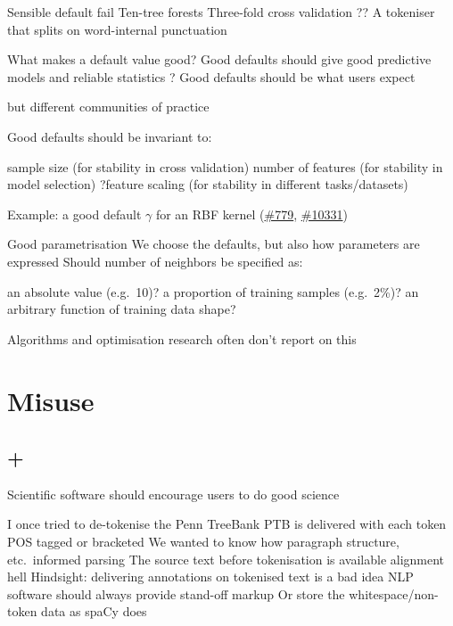 \documentclass[aspectratio=169, 22pt]{beamer}
\newcommand{\issue}[1]{\href{https://github.com/scikit-learn/scikit-learn/issues/#1}{\##1}}
\newenvironment{sectionslide}
			{\subsection*{+}\begin{frame}[fragile,environment=sectionslide]\vfill\begin{center}\Large}
			{\end{center}\vfill\end{frame}}
\begin{document}
\begin{points}{Sensible default fail}
	\p Ten-tree forests
	\p Three-fold cross validation
	\p ?? A tokeniser that splits on word-internal punctuation
\end{points}

\begin{points}{What makes a default value good?}
	\p Good defaults should give good predictive models and reliable statistics
	\p ? Good defaults should be what users expect
	\begin{itemize}
			\p but different communities of practice
	\end{itemize}
	\p Good defaults should be invariant to:
	\begin{itemize}
			\p sample size (for stability in cross validation)
			\p number of features (for stability in model selection)
			\p ?feature scaling (for stability in different tasks/datasets)
	\end{itemize}
	\p Example: a good default $\gamma$ for an RBF kernel (\issue{779}, \issue{10331})
\end{points}

\begin{points}{Good parametrisation}
	\p We choose the defaults, but also how parameters are expressed
	\vfill
	\p Should number of neighbors be specified as:
	\begin{itemize}
		\p an absolute value (e.g.\ 10)?
		\p a proportion of training samples (e.g.\ 2\%)?
		\p an arbitrary function of training data shape?
	\end{itemize}
	\vfill
	\p Algorithms and optimisation research often don't report on this
\end{points}

\section{Misuse} %

\begin{sectionslide}
Scientific software should encourage users to do good science
\end{sectionslide}

\begin{points}{I once tried to de-tokenise the Penn TreeBank}
	\p PTB is delivered with each token POS tagged or bracketed
	\p We wanted to know how paragraph structure, etc.\ informed parsing
	\p The source text before tokenisation is available
	\p[$\Rightarrow$] alignment hell
	\vfill
	\p Hindsight: delivering annotations on tokenised text is a bad idea
	\p NLP software should always provide stand-off markup
	\p Or store the whitespace/non-token data as spaCy does
\end{points}
\end{document}
